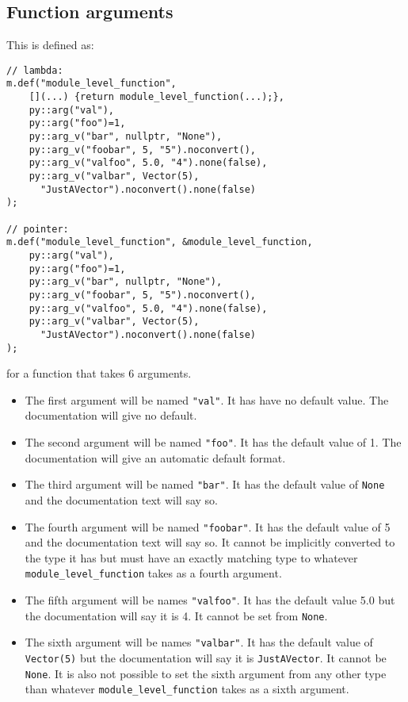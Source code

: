 \subsection{Function arguments}
This is defined as:
\begin{verbatim}
// lambda:
m.def("module_level_function",
    [](...) {return module_level_function(...);},
    py::arg("val"),
    py::arg("foo")=1,
    py::arg_v("bar", nullptr, "None"),
    py::arg_v("foobar", 5, "5").noconvert(),
    py::arg_v("valfoo", 5.0, "4").none(false),
    py::arg_v("valbar", Vector(5),
      "JustAVector").noconvert().none(false)
);

// pointer:
m.def("module_level_function", &module_level_function,
    py::arg("val"),
    py::arg("foo")=1,
    py::arg_v("bar", nullptr, "None"),
    py::arg_v("foobar", 5, "5").noconvert(),
    py::arg_v("valfoo", 5.0, "4").none(false),
    py::arg_v("valbar", Vector(5),
      "JustAVector").noconvert().none(false)
);
\end{verbatim}
for a function that takes 6 arguments.
\begin{itemize}
\item The first argument will be named \texttt{"val"}.  It has have no default value.  The documentation will give no default.
\item The second argument will be named \texttt{"foo"}.  It has the default value of 1.  The documentation will give an automatic default format.
\item The third argument will be named \texttt{"bar"}.  It has the default value of \texttt{None} and the documentation text will say so.
\item The fourth argument will be named \texttt{"foobar"}.  It has the default value of 5 and the documentation text will say so.  It cannot be implicitly converted to the type it has but must have an exactly matching type to whatever \texttt{module_level_function} takes as a fourth argument.
\item The fifth argument will be names \texttt{"valfoo"}.  It has the default value 5.0 but the documentation will say it is 4.  It cannot be set from \texttt{None}.
\item The sixth argument will be names \texttt{"valbar"}.  It has the default value of \texttt{Vector(5)} but the documentation will say it is \texttt{JustAVector}.  It cannot be \texttt{None}.  It is also not possible to set the sixth argument from any other type than whatever \texttt{module_level_function} takes as a sixth argument.
\end{itemize}

